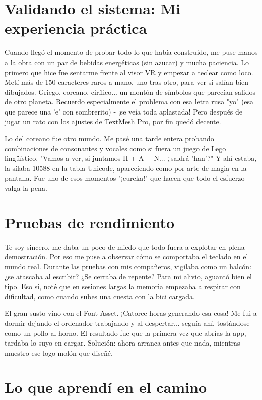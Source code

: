 \section{Validando el sistema: Mi experiencia práctica}

Cuando llegó el momento de probar todo lo que había construido, me puse manos a la obra con un par de bebidas energéticas (sin azucar) y mucha paciencia. Lo primero que hice fue sentarme frente al visor VR y empezar a teclear como loco. Metí más de 150 caracteres raros a mano, uno tras otro, para ver si salían bien dibujados. Griego, coreano, cirílico... un montón de símbolos que parecían salidos de otro planeta. Recuerdo especialmente el problema con esa letra rusa "yo" (esa que parece una 'e' con sombrerito) - ¡se veía toda aplastada! Pero después de jugar un rato con los ajustes de TextMesh Pro, por fin quedó decente.

Lo del coreano fue otro mundo. Me pasé una tarde entera probando combinaciones de consonantes y vocales como si fuera un juego de Lego lingüístico. "Vamos a ver, si juntamos H + A + N... ¿saldrá 'han'?" Y ahí estaba, la sílaba 10588 en la tabla Unicode, apareciendo como por arte de magia en la pantalla. Fue uno de esos momentos "¡eureka!" que hacen que todo el esfuerzo valga la pena.

\section{Pruebas de rendimiento}

Te soy sincero, me daba un poco de miedo que todo fuera a explotar en plena demostración. Por eso me puse a observar cómo se comportaba el teclado en el mundo real. Durante las pruebas con mis compañeros, vigilaba como un halcón: ¿se atascaba al escribir? ¿Se cerraba de repente? Para mi alivio, aguantó bien el tipo. Eso sí, noté que en sesiones largas la memoria empezaba a respirar con dificultad, como cuando subes una cuesta con la bici cargada.

El gran susto vino con el Font Asset. ¡Catorce horas generando esa cosa! Me fui a dormir dejando el ordenador trabajando y al despertar... seguía ahí, tostándose como un pollo al horno. El resultado fue que la primera vez que abrías la app, tardaba lo suyo en cargar. Solución: ahora arranca antes que nada, mientras muestro ese logo molón que diseñé.

\section{Lo que aprendí en el camino}

